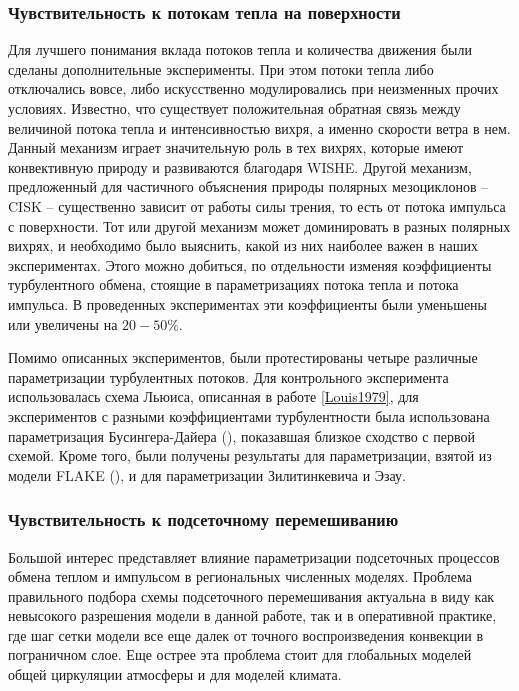 \documentclass[12pt,a4paper]{report}
\begin{document}
\subsubsection{Чувствительность к потокам тепла на поверхности}
Для лучшего понимания вклада потоков тепла и количества движения были сделаны дополнительные эксперименты. При этом потоки тепла либо отключались вовсе, либо искусственно модулировались при неизменных прочих условиях. 
Известно, что существует положительная обратная связь между величиной потока тепла и интенсивностью вихря, а именно скорости ветра в нем. Данный механизм играет значительную роль в тех вихрях, которые имеют конвективную природу и развиваются благодаря WISHE. Другой механизм, предложенный  для частичного объяснения природы полярных мезоциклонов -- CISK -- существенно зависит от работы силы трения, то есть от потока импульса с поверхности. Тот или другой механизм может доминировать в разных полярных вихрях, и необходимо было выяснить, какой из них наиболее важен в наших экспериментах. Этого можно добиться, по отдельности изменяя коэффициенты турбулентного обмена, стоящие в параметризациях потока тепла и потока импульса. В проведенных экспериментах эти коэффициенты были уменьшены или увеличены на $20-50\%$.

Помимо описанных экспериментов, были протестированы четыре различные параметризации турбулентных потоков. Для контрольного эксперимента использовалась схема Льюиса, описанная в работе \ref{Louis1979}, для экспериментов с разными коэффициентами турбулентности была использована параметризация Бусингера-Дайера (\citep{MirandaPhD}), показавшая близкое сходство с первой схемой. Кроме того, были получены результаты для параметризации, взятой из модели FLAKE (\citep{Mironov2006}), и для параметризации Зилитинкевича и Эзау.

\subsubsection{Чувствительность к подсеточному перемешиванию}
Большой интерес представляет влияние параметризации подсеточных процессов обмена теплом и импульсом в региональных численных моделях. Проблема правильного подбора схемы подсеточного перемешивания актуальна в виду как невысокого разрешения модели в данной работе, так и в оперативной практике, где шаг сетки модели все еще далек от точного воспроизведения конвекции в пограничном слое. Еще острее эта проблема стоит для глобальных моделей общей циркуляции атмосферы и для моделей климата. 
\end{document}
